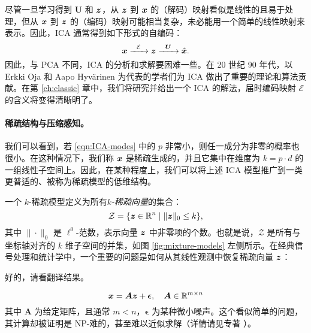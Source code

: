 \documentclass[../../book-main_zh.tex]{subfiles}
\begin{document}
尽管一旦学习得到 $\boldsymbol{U}$ 和 $\bm{z}$，从 $\bm{z}$ 到 $\bm{x}$ 的（解码）映射看似是线性的且易于处理，但从 $\bm{x}$ 到 $\bm{z}$ 的（编码）映射可能相当复杂，未必能用一个简单的线性映射来表示。因此，ICA 通常得到如下形式的自编码：
\begin{equation}
    \bm{x}   \xrightarrow{\hspace{2mm} \mathcal{E}\hspace{2mm}} \bm{z}  \xrightarrow{\hspace{2mm} \boldsymbol{U} \hspace{2mm}} \hat {\bm{x}}.
       \label{eqn:auto-encoding-ICA}
\end{equation}
因此，与 PCA 不同，ICA 的分析和求解要困难一些。在 20 世纪 90 年代，以 Erkki Oja 和 Aapo Hyv\"{a}rinen \cite{hyvarinen-1997,Hyvrinen-2000} 为代表的学者们为 ICA 做出了重要的理论和算法贡献。在第 \ref{ch:classic} 章中，我们将研究并给出一个 ICA 的解法，届时编码映射 $\mathcal{E}$ 的含义将变得清晰明了。



\paragraph{稀疏结构与压缩感知。}
我们可以看到，若 \eqref{eqn:ICA-modes} 中的 $p$ 非常小，则任一成分为非零的概率也很小。在这种情况下，我们称 $\bm{x}$ 是稀疏生成的，并且它集中在维度为 $k = p \cdot d$ 的一组线性子空间上。因此，在某种程度上，我们可以将上述 ICA 模型推广到一类更普适的、被称为稀疏模型的低维结构。

一个 $k$-稀疏模型定义为所有{\em$k$-稀疏向量}的集合：
\begin{equation}
    \mathcal{Z} = \{\bm{z} \in \mathbb{R}^n \mid \|\bm{z}\|_0 \le k\},
\end{equation}
其中 $\| \cdot \|_0$ 是 $\ell^0$-范数，表示向量 $\bm{z}$ 中非零项的个数。也就是说，$\mathcal{Z}$ 是所有与坐标轴对齐的 $k$ 维子空间的并集，如图 \ref{fig:mixture-models} 左侧所示。在经典信号处理和统计学中，一个重要的问题是如何从其线性观测中恢复稀疏向量 $\bm{z}$：

好的，请看翻译结果。

\begin{equation}
    \bm{x} = \boldsymbol{A} \bm{z} + \boldsymbol{\epsilon}, \quad \boldsymbol{A} \in \mathbb{R}^{m\times n}
    \label{eqn:sparse-model}
\end{equation}
其中 $\boldsymbol{A}$ 为给定矩阵，且通常 $m < n$，$\boldsymbol{\epsilon}$ 为某种微小噪声。这个看似简单的问题，其计算却被证明是 NP-难的，甚至难以近似求解（详情请见专著 \cite{Wright-Ma-2022}）。
\end{document}
